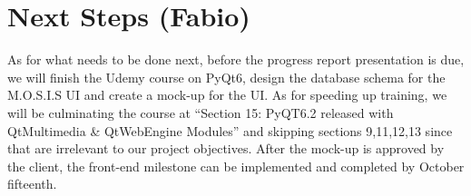 \section{Next Steps (Fabio)}
As for what needs to be done next, before the progress report presentation is due, we will finish the Udemy course on PyQt6, design the database schema for the M.O.S.I.S UI and create a mock-up for the UI. As for speeding up training, we will be culminating the course at ``Section 15: PyQT6.2 released with QtMultimedia \& QtWebEngine Modules'' and skipping sections 9,11,12,13 since that are irrelevant to our project objectives. After the mock-up is approved by the client, the front-end milestone can be implemented and completed by October fifteenth.